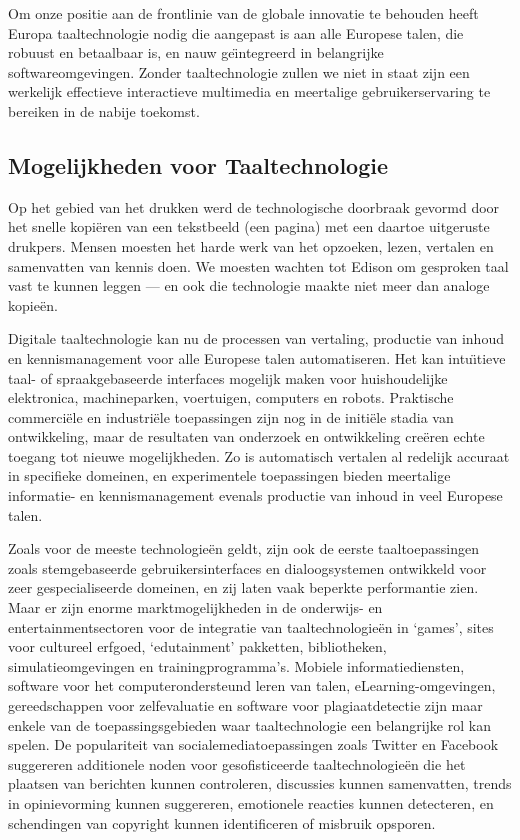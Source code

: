\documentclass[]{../../metanetpaper}
\begin{document}
\begin{multicols}{2}

Om onze positie aan de frontlinie van de globale innovatie te behouden heeft Europa taaltechnologie nodig die aangepast is aan alle Europese talen, die robuust en betaalbaar is, en nauw ge{\"\i}ntegreerd in belangrijke softwareomgevingen. Zonder taaltechnologie zullen we niet in staat zijn een werkelijk effectieve interactieve multimedia en meertalige gebruikerservaring te bereiken in de nabije toekomst.

\subsection{Mogelijkheden voor Taaltechnologie}

    Op het gebied van het drukken werd de technologische doorbraak gevormd door het snelle kopi{\"e}ren van een tekstbeeld (een pagina) met een daartoe uitgeruste drukpers. Mensen moesten het harde werk van het opzoeken, lezen, vertalen en samenvatten van kennis doen. We moesten wachten tot Edison om gesproken taal vast te kunnen leggen --- en ook die technologie maakte niet meer dan analoge kopie{\"e}n.

    Digitale taaltechnologie kan nu de processen van vertaling, productie van inhoud en kennismanagement voor alle Europese talen automatiseren. Het kan intu{\"\i}tieve taal- of spraakgebaseerde interfaces mogelijk maken voor huishoudelijke elektronica, machineparken, voertuigen, computers en robots. Praktische commerci{\"e}le en industri{\"e}le toepassingen zijn nog in de initi{\"e}le stadia van ontwikkeling, maar de resultaten van onderzoek en ontwikkeling cre{\"e}ren echte toegang tot nieuwe mogelijkheden. Zo is automatisch vertalen al redelijk accuraat in specifieke domeinen, en experimentele toepassingen bieden meertalige informatie- en kennismanagement evenals productie van inhoud in veel Europese talen.

    Zoals voor de meeste technologie{\"e}n geldt, zijn ook de eerste taaltoepassingen zoals stemgebaseerde gebruikersinterfaces en dialoogsystemen ontwikkeld voor zeer gespecialiseerde domeinen, en zij laten vaak beperkte performantie zien. Maar er zijn enorme marktmogelijkheden in de onderwijs- en entertainmentsectoren voor de integratie van taaltechnologie{\"e}n in `games', sites voor cultureel erfgoed, `edutainment' pakketten, bibliotheken, simulatieomgevingen en trainingprogramma's. Mobiele informatiediensten, software voor het computerondersteund leren van talen, eLearning-omgevingen, gereedschappen voor zelfevaluatie en software voor plagiaatdetectie zijn maar enkele van de toepassingsgebieden waar taaltechnologie een belangrijke rol kan spelen. De populariteit van socialemediatoepassingen zoals Twitter en Facebook suggereren additionele noden voor gesofisticeerde taaltechnologie{\"e}n die het plaatsen van berichten kunnen controleren, discussies kunnen samenvatten, trends in opinievorming kunnen suggereren, emotionele reacties kunnen detecteren, en schendingen van copyright kunnen identificeren of misbruik opsporen.


\end{multicols}
\end{document}

